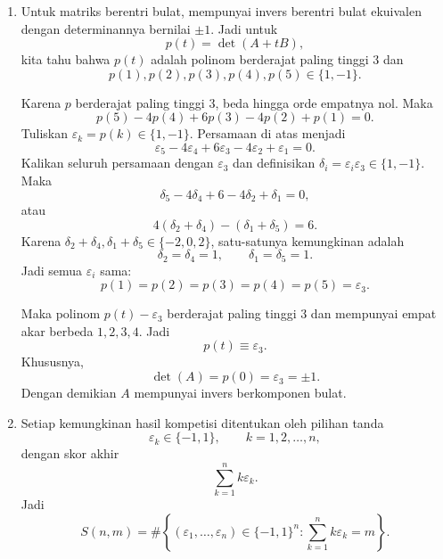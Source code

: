 \documentclass[12pt]{article}
\begin{document}
\begin{enumerate}
  \item Untuk matriks berentri bulat, mempunyai invers berentri bulat ekuivalen dengan determinannya bernilai $\pm 1$.
        Jadi untuk
        \[
          p(t)=\det(A+tB),
        \]
        kita tahu bahwa $p(t)$ adalah polinom berderajat paling tinggi $3$ dan
        \[
          p(1),p(2),p(3),p(4),p(5)\in\{1,-1\}.
        \]

        Karena $p$ berderajat paling tinggi $3$, beda hingga orde empatnya nol. Maka
        \[
          p(5)-4p(4)+6p(3)-4p(2)+p(1)=0.
        \]
        Tuliskan $\varepsilon_k=p(k)\in\{1,-1\}$. Persamaan di atas menjadi
        \[
          \varepsilon_5-4\varepsilon_4+6\varepsilon_3-4\varepsilon_2+\varepsilon_1=0.
        \]
        Kalikan seluruh persamaan dengan $\varepsilon_3$ dan definisikan $\delta_i=\varepsilon_i\varepsilon_3\in\{1,-1\}$. Maka
        \[
          \delta_5-4\delta_4+6-4\delta_2+\delta_1=0,
        \]
        atau
        \[
          4(\delta_2+\delta_4)-(\delta_1+\delta_5)=6.
        \]
        Karena $\delta_2+\delta_4,\delta_1+\delta_5\in\{-2,0,2\}$, satu-satunya kemungkinan adalah
        \[
          \delta_2=\delta_4=1,\qquad \delta_1=\delta_5=1.
        \]
        Jadi semua $\varepsilon_i$ sama:
        \[
          p(1)=p(2)=p(3)=p(4)=p(5)=\varepsilon_3.
        \]

        Maka polinom $p(t)-\varepsilon_3$ berderajat paling tinggi $3$ dan mempunyai empat akar berbeda $1,2,3,4$. Jadi
        \[
          p(t)\equiv \varepsilon_3.
        \]
        Khususnya,
        \[
          \det(A)=p(0)=\varepsilon_3=\pm 1.
        \]
        Dengan demikian $A$ mempunyai invers berkomponen bulat.

  \item Setiap kemungkinan hasil kompetisi ditentukan oleh pilihan tanda
        \[
          \varepsilon_k\in\{-1,1\},\qquad k=1,2,\dots,n,
        \]
        dengan skor akhir
        \[
          \sum_{k=1}^n k\varepsilon_k.
        \]
        Jadi
        \[
          S(n,m)=\#\left\{(\varepsilon_1,\dots,\varepsilon_n)\in\{-1,1\}^n:
          \sum_{k=1}^n k\varepsilon_k=m\right\}.
        \]


\end{enumerate}
\end{document}
